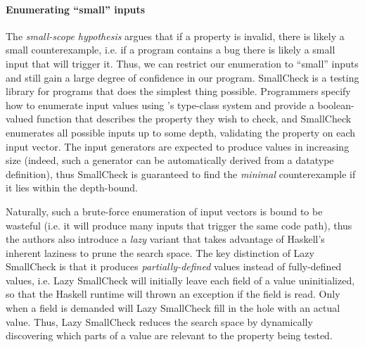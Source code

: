 \paragraph{Enumerating ``small'' inputs}
The \emph{small-scope hypothesis} \cite{jackson_software_2006} argues
that if a property is invalid, there is likely a small counterexample,
i.e. if a program contains a bug there is likely a small input that will
trigger it. Thus, we can restrict our enumeration to ``small'' inputs
and still gain a large degree of confidence in our program.
%
SmallCheck \cite{runciman_smallcheck_2008} is a testing library for
\haskell programs that does the simplest thing possible.
%
Programmers specify how to enumerate input values using \haskell's
type-class system \cite{wadler_how_1989} and provide a boolean-valued
function that describes the property they wish to check, and SmallCheck
enumerates all possible inputs up to some depth, validating the property
on each input vector.
%
The input generators are expected to produce values in increasing size
(indeed, such a generator can be automatically derived from a datatype
definition), thus SmallCheck is guaranteed to find the \emph{minimal}
counterexample if it lies within the depth-bound.

Naturally, such a brute-force enumeration of input vectors is bound to
be wasteful (i.e. it will produce many inputs that trigger the same code
path), thus the authors also introduce a \emph{lazy} variant that takes
advantage of Haskell's inherent laziness to prune the search space.
%
The key distinction of Lazy SmallCheck is that it produces
\emph{partially-defined} values instead of fully-defined values,
i.e. Lazy SmallCheck will initially leave each field of a value
uninitialized, so that the Haskell runtime will thrown an exception if
the field is read.
%
Only when a field is demanded will Lazy SmallCheck fill in the hole with
an actual value. Thus, Lazy SmallCheck reduces the search space by
dynamically discovering which parts of a value are relevant to the
property being tested.
%
%

